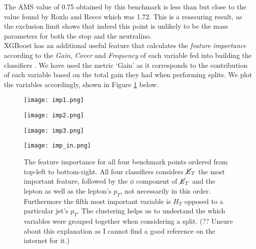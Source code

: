 The AMS value of 0.75 obtained by this benchmark is less than but close to the value found by Roxlo and Reece \cite{roxlo2018opening} which was 1.72. This is a reassuring result, as the exclusion limit shows that indeed this point is unlikely to be the mass parameters for both the stop and the neutralino. \\

XGBoost has an additional useful feature that calculates the \textit{feature importance} according to the \textit{Gain}, \textit{Cover} and \textit{Frequency} of each variable fed into building the classifiers \cite{xgboost}. We have used the metric `Gain' as it corresponds to the contribution of each variable based on the total gain they had when performing splits. We plot the variables accordingly, shown in Figure \ref{fig:imps} below. \\

\begin{figure}[htbp]
\centering
  \begin{minipage}[htbp]{0.49\textwidth}
    \centering
    \texttt{[image: imp1.png]}
  \end{minipage}
  \hfill
  \begin{minipage}[htbp]{0.49\textwidth}
    \centering
    \texttt{[image: imp2.png]}
  \end{minipage}
  \hfill
  \begin{minipage}[htbp]{0.49\textwidth}
    \centering
    \texttt{[image: imp3.png]}
  \end{minipage}
  \hfill
  \begin{minipage}[htbp]{0.49\textwidth}
    \centering
    \texttt{[image: imp\_in.png]}
  \end{minipage}
  \caption{The feature importance for all four benchmark points ordered from top-left to bottom-right. All four classifiers considers $\cancel{\it{E}}_{T}$ the most important feature, followed by the $\phi$ component of $\cancel{\it{E}}_{T}$ and the lepton as well as the lepton's $p_T$, not necessarily in this order. Furthermore the fifth most important variable is $H_T$ opposed to a particular jet's $p_T$. The clustering helps us to undestand the which variables were grouped together when considering a split. (??  Unsure about this explanation as I cannot find a good reference on the internet for it.)}
  \label{fig:imps}
\end{figure}

